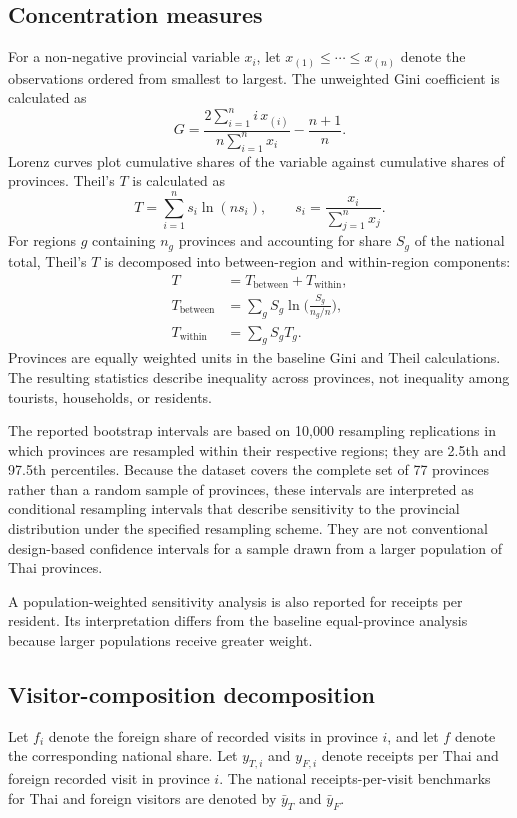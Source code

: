 \documentclass[11pt,a4paper]{article}
\theoremstyle{plain}\newtheorem{proposition}{Proposition}
\theoremstyle{definition}\newtheorem{definition}{Definition}
\begin{document}
\subsection{Concentration measures}
For a non-negative provincial variable $x_i$, let $x_{(1)}\le\cdots\le x_{(n)}$ denote the observations ordered from smallest to largest. The unweighted Gini coefficient is calculated as
\begin{equation}
G=\frac{2\sum_{i=1}^n i\,x_{(i)}}{n\sum_{i=1}^n x_i}-\frac{n+1}{n}.
\end{equation}
Lorenz curves plot cumulative shares of the variable against cumulative shares of provinces. Theil's $T$ is calculated as
\begin{equation}
T=\sum_{i=1}^n s_i\ln(ns_i),\qquad s_i=\frac{x_i}{\sum_{j=1}^n x_j}.
\end{equation}
For regions $g$ containing $n_g$ provinces and accounting for share $S_g$ of the national total, Theil's $T$ is decomposed into between-region and within-region components:
\begin{align}
T&=T_{\text{between}}+T_{\text{within}},\\
T_{\text{between}}&=\sum_g S_g\ln\!\Big(\frac{S_g}{n_g/n}\Big),\\
T_{\text{within}}&=\sum_g S_g T_g.
\end{align}
Provinces are equally weighted units in the baseline Gini and Theil calculations. The resulting statistics describe inequality across provinces, not inequality among tourists, households, or residents.

The reported bootstrap intervals are based on 10,000 resampling replications in which provinces are resampled within their respective regions; they are 2.5th and 97.5th percentiles. Because the dataset covers the complete set of 77 provinces rather than a random sample of provinces, these intervals are interpreted as conditional resampling intervals that describe sensitivity to the provincial distribution under the specified resampling scheme. They are not conventional design-based confidence intervals for a sample drawn from a larger population of Thai provinces.

A population-weighted sensitivity analysis is also reported for receipts per resident. Its interpretation differs from the baseline equal-province analysis because larger populations receive greater weight.

\subsection{Visitor-composition decomposition}
Let $f_i$ denote the foreign share of recorded visits in province $i$, and let $f$ denote the corresponding national share. Let $y_{T,i}$ and $y_{F,i}$ denote receipts per Thai and foreign recorded visit in province $i$. The national receipts-per-visit benchmarks for Thai and foreign visitors are denoted by $\bar y_T$ and $\bar y_F$.
\end{document}
